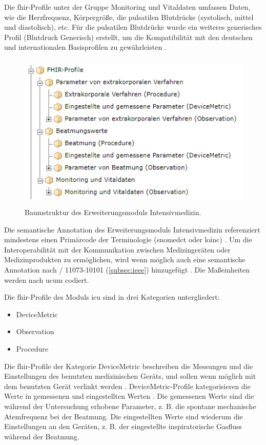 Die \ac{fhir}-Profile unter der Gruppe Monitoring und Vitaldaten umfassen Daten, wie die Herzfrequenz, Körpergröße, die pulsatilen Blutdrücke (systolisch, mittel und diastolisch), etc. Für die pulsatilen Blutdrücke wurde ein weiteres generisches Profil (Blutdruck Generisch) erstellt, um die Kompatibilität mit den deutschen und internationalen Basisprofilen zu gewährleisten \cite{icukdz}.

\begin{figure}[ht]
	\centering
	\includegraphics[height=7.5cm]{figures/icu_modul_tree}
	\caption[Baumstruktur des Erweiterungsmoduls \glqq Intensivmedizin\grqq{}]{Baumstruktur des Erweiterungsmoduls \glqq Intensivmedizin\grqq{}.}
	\label{fig:icutree}
\end{figure}

Die semantische Annotation des Erweiterungsmoduls \glqq Intensivmedizin\grqq{} referenziert mindestens einen Primärcode der Terminologie (\ac{snomedct} oder \ac{loinc}) \cite{icukdz, modicuvid}. Um die Interoperabilität mit der Kommunikation zwischen Medizingeräten oder Medizinprodukten zu ermöglichen, wird wenn möglich auch eine semantische Annotation nach / 11073-10101\texttrademark{} (\ref{subsec:ieee}) hinzugefügt \cite{icukdz}. Die Maßeinheiten werden nach \ac{ucum} codiert.

Die \ac{fhir}-Profile des Moduls \ac{icu} sind in drei Kategorien untergliedert:

\begin{itemize}
	\item DeviceMetric
	\item Observation
	\item Procedure
\end{itemize}

Die \ac{fhir}-Profile der Kategorie \glqq DeviceMetric\grqq{} beschreiben die Messungen und die Einstellungen des benutzten medizinischen Geräts, und sollen wenn möglich mit dem benutzten Gerät verlinkt werden \cite{icukdz}. \glqq DeviceMetric\grqq{}-Profile kategorisieren die Werte in gemessenen und eingestellten Werten \cite{devicemetric}. Die gemessenen Werte sind die während der Untersuchung erhobene Parameter, z. B. die spontane mechanische Atemfrequenz bei der Beatmung. Die eingestellten Werte sind wiederum die Einstellungen an den Geräten, z. B. der eingestellte inspiratorische Gasfluss während der Beatmung.

